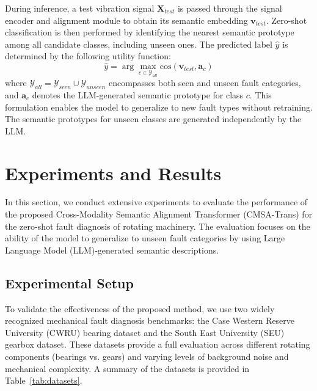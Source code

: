 \documentclass[journal]{IEEEtran}
\begin{document}
During inference, a test vibration signal $\mathbf{X}_{test}$ is passed through the signal encoder and alignment module to obtain its semantic embedding $\mathbf{v}_{test}$. Zero-shot classification is then performed by identifying the nearest semantic prototype among all candidate classes, including unseen ones. The predicted label $\hat{y}$ is determined by the following utility function:
\begin{equation}
\hat{y} = \arg\max_{c \in \mathcal{Y}_{all}} \text{cos}(\mathbf{v}_{test}, \mathbf{a}_c)
\end{equation}
where $\mathcal{Y}_{all} = \mathcal{Y}_{seen} \cup \mathcal{Y}_{unseen}$ encompasses both seen and unseen fault categories, and $\mathbf{a}_c$ denotes the LLM-generated semantic prototype for class $c$. This formulation enables the model to generalize to new fault types without retraining. The semantic prototypes for unseen classes are generated independently by the LLM.

\section{Experiments and Results}
\label{sec:experiments}

In this section, we conduct extensive experiments to evaluate the performance of the proposed Cross-Modality Semantic Alignment Transformer (CMSA-Trans) for the zero-shot fault diagnosis of rotating machinery. The evaluation focuses on the ability of the model to generalize to unseen fault categories by using Large Language Model (LLM)-generated semantic descriptions.

\subsection{Experimental Setup}

To validate the effectiveness of the proposed method, we use two widely recognized mechanical fault diagnosis benchmarks: the Case Western Reserve University (CWRU) bearing dataset and the South East University (SEU) gearbox dataset. These datasets provide a full evaluation across different rotating components (bearings vs. gears) and varying levels of background noise and mechanical complexity. A summary of the datasets is provided in Table~\ref{tab:datasets}.
\end{document}
